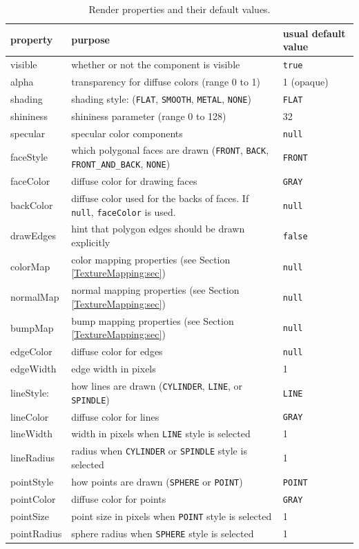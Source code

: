 \begin{table}
\begin{center}
\begin{tabular}{|lll|}
\hline property & purpose & usual default value \\ \hline
visible & whether or not the component is visible & {\tt true} \\
alpha & transparency for diffuse colors (range 0 to 1) & 1 (opaque) \\
shading & shading style: 
({\tt FLAT}, {\tt SMOOTH}, {\tt METAL}, {\tt NONE}) & {\tt FLAT}\\
shininess & shininess parameter (range 0 to 128) & 32 \\
specular & specular color components & {\tt null} \\
\hline
faceStyle &
which polygonal faces are drawn ({\tt FRONT}, {\tt BACK},
{\tt FRONT\_AND\_BACK}, {\tt NONE}) & {\tt FRONT} \\
faceColor &
diffuse color for drawing faces & {\tt GRAY} \\
backColor &
diffuse color used for the backs of faces. 
If {\tt null}, {\tt faceColor} is used. & {\tt null} \\
drawEdges & hint that polygon edges should be drawn explicitly & {\tt false} \\
\hline
colorMap & color mapping properties 
(see Section \ref{TextureMapping:sec}) & {\tt null} \\
normalMap & normal mapping properties 
(see Section \ref{TextureMapping:sec}) & {\tt null} \\
bumpMap & bump mapping properties 
(see Section \ref{TextureMapping:sec}) & {\tt null} \\
\hline
edgeColor & diffuse color for edges & {\tt null} \\
edgeWidth & edge width in pixels & 1 \\
\hline
lineStyle: &
how lines are drawn ({\tt CYLINDER}, {\tt LINE}, or {\tt SPINDLE}) & 
{\tt LINE} \\
lineColor & diffuse color for lines & {\tt GRAY} \\
lineWidth & width in pixels when {\tt LINE} style is selected & 1 \\
lineRadius & radius when {\tt CYLINDER} or {\tt SPINDLE} style is selected &
1 \\
\hline
pointStyle & how points are drawn ({\tt SPHERE} or {\tt POINT}) & {\tt POINT} \\
pointColor & diffuse color for points & {\tt GRAY} \\
pointSize & point size in pixels when {\tt POINT} style is selected & 1 \\
pointRadius & sphere radius when {\tt SPHERE} style is selected & 1 \\
\hline
\end{tabular}
\end{center}
\caption{Render properties and their default values.}
\label{RenderProps:tab}
\end{table}

